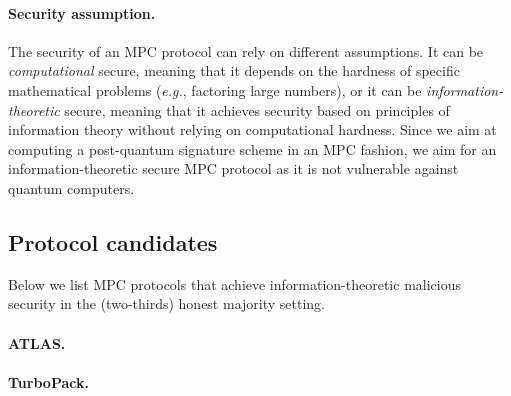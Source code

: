 \paragraph{Security assumption.}
The security of an MPC protocol can rely on different assumptions. It can be \textit{computational} secure, meaning that it depends on the hardness of specific mathematical problems (\textit{e.g.}, factoring large numbers), or it can be \textit{information-theoretic} secure, meaning that it achieves security based on principles of information theory without relying on computational hardness.
Since we aim at computing a post-quantum signature scheme in an MPC fashion, we aim for an information-theoretic secure MPC protocol as it is not vulnerable against quantum computers.

\subsection{Protocol candidates}
Below we list MPC protocols that achieve information-theoretic malicious security in the (two-thirds) honest majority setting.

\paragraph{ATLAS.}

\paragraph{TurboPack.}